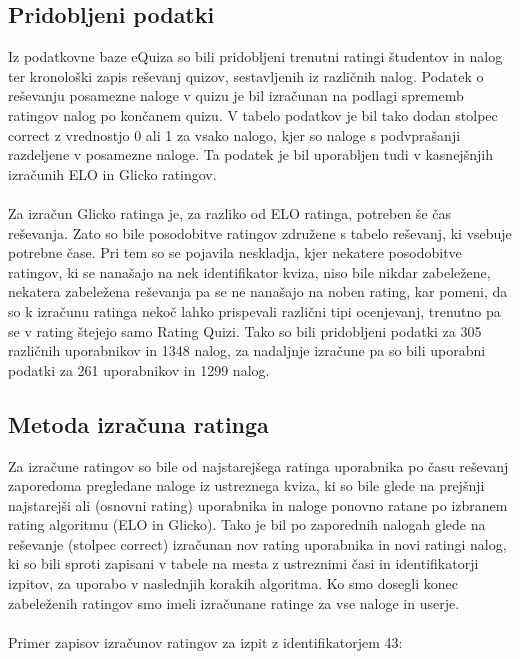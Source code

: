 \documentclass{IEEEtran}
\makeatletter
\let\old@subsection\subsection
\renewcommand{\subsection}[1]{\bigskip\old@subsection{#1}\@afterindentfalse\@afterheading}
\makeatother
\begin{document}
\subsection{Pridobljeni podatki}
Iz podatkovne baze eQuiza so bili pridobljeni trenutni ratingi študentov in nalog ter kronološki zapis reševanj quizov, sestavljenih iz različnih nalog. Podatek o reševanju posamezne naloge v quizu je bil izračunan na podlagi sprememb ratingov nalog po končanem quizu. V tabelo podatkov je bil tako dodan stolpec correct z vrednostjo 0 ali 1 za vsako nalogo, kjer so naloge s podvprašanji razdeljene v posamezne naloge. Ta podatek je bil uporabljen tudi v kasnejšnjih izračunih ELO in Glicko ratingov.
\hfill
\\
\\
Za izračun Glicko ratinga je, za razliko od ELO ratinga, potreben še čas reševanja. Zato so bile posodobitve ratingov združene s tabelo reševanj, ki vsebuje potrebne čase. Pri tem so se pojavila neskladja, kjer nekatere posodobitve ratingov, ki se nanašajo na nek identifikator kviza, niso bile nikdar zabeležene, nekatera zabeležena reševanja pa se ne nanašajo na noben rating, kar pomeni, da so k izračunu ratinga nekoč lahko prispevali različni tipi ocenjevanj, trenutno pa se v rating štejejo samo Rating Quizi. Tako so bili pridobljeni podatki za 305 različnih uporabnikov in 1348 nalog, za nadaljnje izračune pa so bili uporabni podatki za 261 uporabnikov in 1299 nalog.
\\
\subsection{Metoda izračuna ratinga}

Za izračune ratingov so bile od najstarejšega ratinga uporabnika po času reševanj zaporedoma pregledane naloge iz ustreznega kviza, ki so bile glede na prejšnji najstarejši ali (osnovni rating) uporabnika in naloge ponovno ratane po izbranem rating algoritmu (ELO in Glicko). Tako je bil po zaporednih nalogah glede na reševanje (stolpec correct) izračunan nov rating uporabnika in novi ratingi nalog, ki so bili sproti zapisani v tabele na mesta z ustreznimi časi in identifikatorji izpitov, za uporabo v naslednjih korakih algoritma. Ko smo dosegli konec zabeleženih ratingov smo imeli izračunane ratinge za vse naloge in userje.
\hfill
\\
\\
Primer zapisov izračunov ratingov za izpit z identifikatorjem 43:
\end{document}
